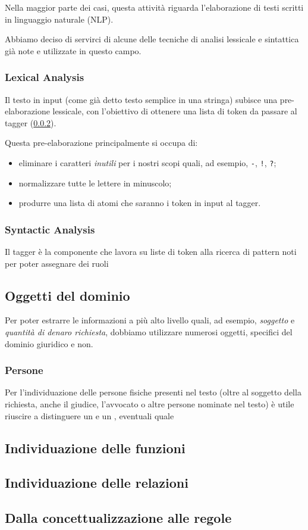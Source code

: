 Nella maggior parte dei casi, questa attività riguarda l'elaborazione di testi scritti in linguaggio naturale (NLP).

Abbiamo deciso di servirci di alcune delle tecniche di analisi lessicale e sintattica già note e utilizzate in questo campo.

\subsubsection{Lexical Analysis}
Il testo in input (come già detto testo semplice in una stringa) subisce una pre-elaborazione lessicale, con l'obiettivo di ottenere una lista di token da passare al tagger (\ref{tagger}).

Questa pre-elaborazione principalmente si occupa di:
\begin{itemize}
\item eliminare i caratteri \emph{inutili} per i nostri scopi quali, ad esempio, \verb+-+, \verb+!+, \verb+?+;
\item normalizzare tutte le lettere in minuscolo;
\item produrre una lista di atomi che saranno i token in input al tagger.
\end{itemize}

\subsubsection{Syntactic Analysis}
\label{tagger}
Il tagger è la componente che lavora su liste di token alla ricerca di pattern noti per poter assegnare dei ruoli

\subsection{Oggetti del dominio}
Per poter estrarre le informazioni a più alto livello quali, ad esempio, \emph{soggetto} e \emph{quantità di denaro richiesta}, dobbiamo utilizzare numerosi oggetti, specifici del dominio giuridico e non.

\subsubsection{Persone}
Per l'individuazione delle persone fisiche presenti nel testo (oltre al soggetto della richiesta, anche il giudice, l'avvocato o altre persone nominate nel testo) è utile riuscire a distinguere un  e un , eventuali  quale 


\subsection{Individuazione delle funzioni}

\subsection{Individuazione delle relazioni}

\subsection{Dalla concettualizzazione alle regole}

